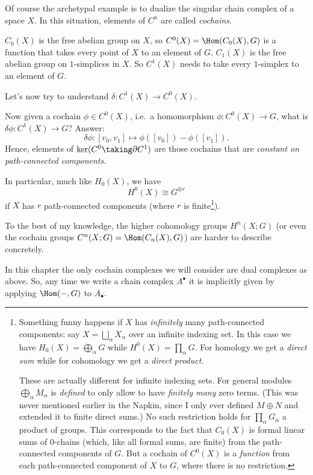 \documentclass[11pt]{scrreprt}
\begin{document}
\begin{example}
	[$C^0(X; G)$, $C^1(X; G)$, and $H^0(X;G)$]
	Of course the archetypal example is to dualize the singular chain complex
	of a space $X$. In this situation, elements of $C^n$ are called \emph{cochains}.
	\begin{itemize}
		\ii $C_0(X)$ is the free abelian group on $X$,
		so $C^0(X) = \Hom(C_0(X), G)$ is a function that
		takes every point of $X$ to an element of $G$.
		\ii $C_1(X)$ is the free abelian group on $1$-simplices in $X$.
		So $C^1(X)$ needs to take every $1$-simplex to an element of $G$.
	\end{itemize}
	Let's now try to understand $\delta : C^1(X) \to C^0(X)$.

	Now given a cochain $\phi \in C^0(X)$, i.e.\ a homomorphism $\phi : C^0(X) \to G$,
	what is $\delta\phi : C^1(X) \to G$?
	Answer: 
	\[ \delta\phi : [v_0, v_1] \mapsto \phi([v_0]) - \phi([v_1]). \]
	Hence, elements of $\ker(C^0 \taking\partial C^1)$ are those cochains
	that are \emph{constant on path-connected components}.
\end{example}
In particular, much like $H_0(X)$, we have \[ H^0(X) \cong G^{\oplus r} \]
if $X$ has $r$ path-connected components (where $r$ is finite\footnote{%
	Something funny happens if $X$ has \emph{infinitely} many path-connected components:
	say $X = \bigsqcup_\alpha X_\alpha$ over an infinite indexing set.
	In this case we have
	$H_0(X) = \bigoplus_\alpha G$ while $H^0(X) = \prod_\alpha G$.
	For homology we get a \emph{direct sum} while
	for cohomology we get a \emph{direct product}.

	These are actually different for infinite indexing sets.
	For general modules $\bigoplus_\alpha M_\alpha$ is \emph{defined} to only allow
	to have \emph{finitely many} zero terms.
	(This was never mentioned earlier in the Napkin,
	since I only ever defined $M \oplus N$ and extended it to finite direct sums.)
	No such restriction holds for $\prod_\alpha G_\alpha$ a product of groups.
	This corresponds to the fact that $C_0(X)$ is formal linear sums of $0$-chains
	(which, like all formal sums, are finite)
	from the path-connected components of $G$.
	But a cochain of $C^0(X)$ is a \emph{function}
	from each path-connected component of $X$ to $G$,
	where there is no restriction.
}).

To the best of my knowledge, the higher cohomology groups $H^n(X; G)$
(or even the cochain groups $C^n(X; G) = \Hom(C_n(X), G)$) are harder to describe concretely.

\begin{abuse}
	In this chapter the only cochain complexes
	we will consider are dual complexes as above.
	So, any time we write a chain complex $A^\bullet$ it is implicitly given
	by applying $\Hom(-,G)$ to $A_\bullet$.
\end{abuse}
\end{document}
